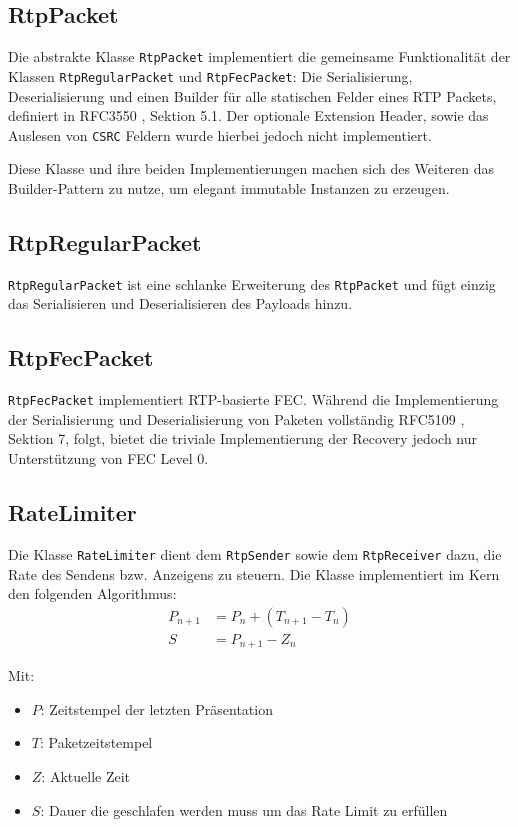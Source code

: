 \documentclass[a4paper,12pt]{article}
\begin{document}
\subsection{RtpPacket}

Die abstrakte Klasse \texttt{RtpPacket} implementiert die gemeinsame Funktionalität der Klassen \texttt{RtpRegularPacket} und \texttt{RtpFecPacket}: Die Serialisierung, Deserialisierung und einen Builder für alle statischen Felder eines RTP Packets, definiert in RFC3550 \cite{RFC3550}, Sektion 5.1.
Der optionale Extension Header, sowie das Auslesen von \texttt{CSRC} Feldern wurde hierbei jedoch nicht implementiert.

Diese Klasse und ihre beiden Implementierungen machen sich des Weiteren das Builder-Pattern zu nutze, um elegant immutable Instanzen zu erzeugen.

\subsection{RtpRegularPacket}

\texttt{RtpRegularPacket} ist eine schlanke Erweiterung des \texttt{RtpPacket} und fügt einzig das Serialisieren und Deserialisieren des Payloads hinzu.

\subsection{RtpFecPacket}

\texttt{RtpFecPacket} implementiert RTP-basierte FEC.
Während die Implementierung der Serialisierung und Deserialisierung von Paketen vollständig RFC5109 \cite{RFC5109},  Sektion 7, folgt, bietet die triviale Implementierung der Recovery jedoch nur Unterstützung von FEC Level 0.

\subsection{RateLimiter}

Die Klasse \texttt{RateLimiter} dient dem \texttt{RtpSender} sowie dem \texttt{RtpReceiver} dazu, die Rate des Sendens bzw. Anzeigens zu steuern.
Die Klasse implementiert im Kern den folgenden Algorithmus:
\begin{align*}
P_{n+1} &= P_n + \left( T_{n+1} - T_n \right) \\
S &= P_{n+1} - Z_n
\end{align*}

Mit:
\vspace{-1.5\topsep}
\begin{itemize}
	\setlength{\itemsep}{0em}
	\item $P$: Zeitstempel der letzten Präsentation
	\item $T$: Paketzeitstempel
	\item $Z$: Aktuelle Zeit
	\item $S$: Dauer die geschlafen werden muss um das Rate Limit zu erfüllen
\end{itemize}
\end{document}
